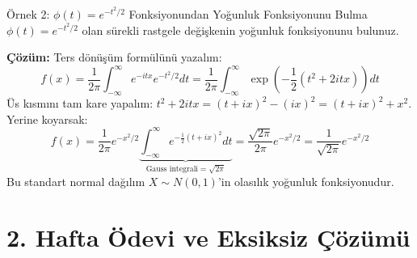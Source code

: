 \documentclass[12pt,a4paper]{article}
\begin{document}
\begin{ornek}{Örnek 2: $\phi(t) = e^{-t^2/2}$ Fonksiyonundan Yoğunluk Fonksiyonunu Bulma}
$\phi(t) = e^{-t^2/2}$ olan sürekli rastgele değişkenin yoğunluk fonksiyonunu bulunuz.

\bigskip
\textbf{Çözüm:}
Ters dönüşüm formülünü yazalım:
\begin{equation}
    f(x) = \frac{1}{2\pi} \int_{-\infty}^{\infty} e^{-itx} e^{-t^2/2} dt = \frac{1}{2\pi} \int_{-\infty}^{\infty} \exp\left( - \frac{1}{2}(t^2 + 2itx) \right) dt
\end{equation}
Üs kısmını tam kare yapalım: $t^2 + 2itx = (t + ix)^2 - (ix)^2 = (t + ix)^2 + x^2$.  
Yerine koyarsak:
\begin{equation}
    f(x) = \frac{1}{2\pi} e^{-x^2/2} \underbrace{\int_{-\infty}^{\infty} e^{-\frac{1}{2}(t + ix)^2} dt}_{\text{Gauss integrali} = \sqrt{2\pi}} = \frac{\sqrt{2\pi}}{2\pi} e^{-x^2/2} = \boxed{\frac{1}{\sqrt{2\pi}} e^{-x^2/2}}
\end{equation}
Bu standart normal dağılım $X \sim N(0, 1)$'in olasılık yoğunluk fonksiyonudur.
\end{ornek}

\vspace{0.5em}
\section{2. Hafta Ödevi ve Eksiksiz Çözümü}
\end{document}
